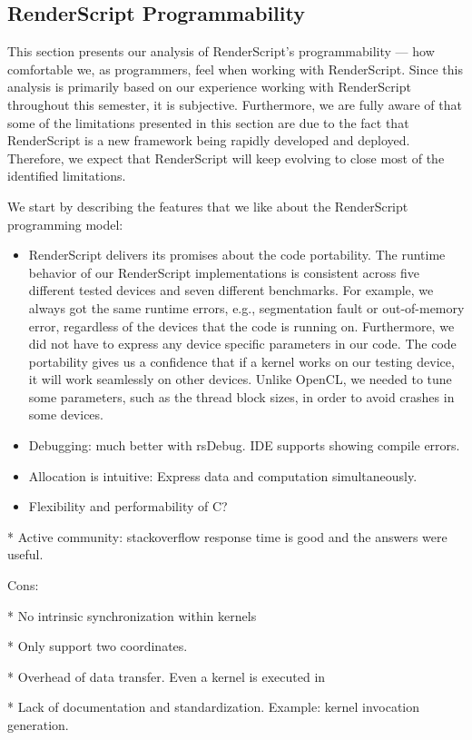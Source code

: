 \subsection{RenderScript Programmability}
This section presents our analysis of RenderScript's programmability --- how
comfortable we, as programmers, feel when working with RenderScript. Since this
analysis is primarily based on our experience working with RenderScript
throughout this semester, it is subjective. Furthermore, we are fully aware of
that some of the limitations presented in this section are due to the fact that
RenderScript is a new framework being rapidly developed and deployed.
Therefore, we expect that RenderScript will keep evolving to close most of the
identified limitations.

We start by describing the features that we like about the RenderScript
programming model:

\begin{itemize}
\item RenderScript delivers its promises about the code portability. The runtime
behavior of our RenderScript implementations is consistent across five different
tested devices and seven different benchmarks. For example, we always got the
same runtime errors, e.g., segmentation fault or out-of-memory error, regardless
of the devices that the code is running on. Furthermore, we did not have to
express any device specific parameters in our code. The code portability gives
us a confidence that if a kernel works on our testing device, it will work
seamlessly on other devices. Unlike OpenCL, we needed to tune some parameters,
such as the thread block sizes, in order to avoid crashes in some devices.

\item Debugging: much better with rsDebug. IDE supports showing compile errors.

\item Allocation is intuitive: Express data and computation simultaneously.

\item Flexibility and performability of C?

\end{itemize}

* Active community: stackoverflow response time is good and the answers were useful.

Cons:

* No intrinsic synchronization within kernels

* Only support two coordinates.

* Overhead of data transfer. Even a kernel is executed in 

* Lack of documentation and standardization. Example: kernel invocation generation.


